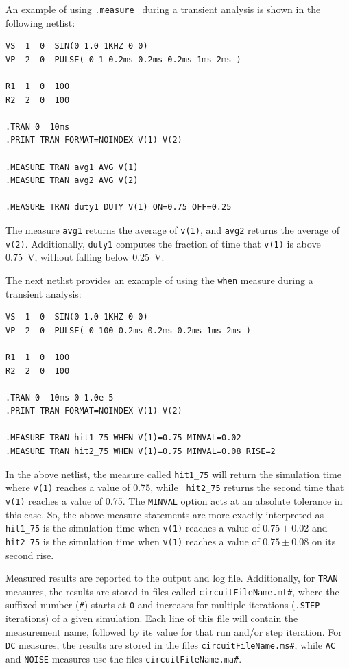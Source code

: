 An example of using \texttt{.measure } during a transient analysis is shown in the following netlist:

\begin{verbatim}
VS  1  0  SIN(0 1.0 1KHZ 0 0)
VP  2  0  PULSE( 0 1 0.2ms 0.2ms 0.2ms 1ms 2ms )

R1  1  0  100
R2  2  0  100

.TRAN 0  10ms
.PRINT TRAN FORMAT=NOINDEX V(1) V(2) 

.MEASURE TRAN avg1 AVG V(1)
.MEASURE TRAN avg2 AVG V(2)

.MEASURE TRAN duty1 DUTY V(1) ON=0.75 OFF=0.25

\end{verbatim}

The measure \texttt{avg1} returns the average of \texttt{v(1)}, and
\texttt{avg2} returns the average of \texttt{v(2)}. Additionally,
\texttt{duty1} computes the fraction of time that \texttt{v(1)} is above
0.75~V, without falling below 0.25~V. 

The next netlist provides an example of using the \texttt{when} measure
during a transient analysis:

\begin{verbatim}
VS  1  0  SIN(0 1.0 1KHZ 0 0)
VP  2  0  PULSE( 0 100 0.2ms 0.2ms 0.2ms 1ms 2ms )

R1  1  0  100
R2  2  0  100

.TRAN 0  10ms 0 1.0e-5
.PRINT TRAN FORMAT=NOINDEX V(1) V(2) 

.MEASURE TRAN hit1_75 WHEN V(1)=0.75 MINVAL=0.02
.MEASURE TRAN hit2_75 WHEN V(1)=0.75 MINVAL=0.08 RISE=2

\end{verbatim}

In the above netlist, the measure called \texttt{hit1\_75} will return the
simulation time where \texttt{v(1)} reaches a value of 0.75, while {\tt
hit2\_75} returns the second time that \texttt{v(1)} reaches a value of 0.75.
The \texttt{MINVAL} option acts at an absolute tolerance in this case. So, the
above measure statements are more exactly interpreted as \texttt{hit1\_75} is
the simulation time when \texttt{v(1)} reaches a value of $0.75 \pm 0.02$ and
\texttt{hit2\_75} is the simulation time when {\tt v(1)} reaches a value of
$0.75 \pm 0.08$ on its second rise.

Measured results are reported to the output and log file.  Additionally, for \texttt{TRAN}
measures, the results are stored in files called \texttt{circuitFileName.mt\#}, where
the suffixed number (\texttt{\#}) starts at \texttt{0} and increases for multiple
iterations (\texttt{.STEP} iterations) of a given simulation. Each line of this file
will contain the measurement name, followed by its value for that run and/or step 
iteration.  For \texttt{DC} measures, the results are stored in the files
\texttt{circuitFileName.ms\#}, while \texttt{AC} and \texttt{NOISE} measures
use the files \texttt{circuitFileName.ma\#}.

